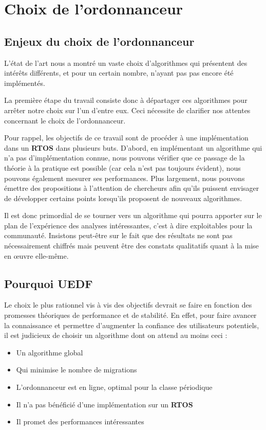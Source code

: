 \section{Choix de l'ordonnanceur}

	\subsection{Enjeux du choix de l'ordonnanceur}

	L'état de l'art nous a montré un vaste choix d'algorithmes qui présentent 
	des intérêts différents, et pour un certain nombre, 
	n'ayant pas pas encore été implémentés. \newline
	
	La première étape du travail consiste donc à départager ces algorithmes pour arrêter notre choix sur l'un d'entre eux. Ceci nécessite de clarifier nos attentes concernant le choix de l'ordonnanceur.\newline
	
	Pour rappel, les objectifs de ce travail sont de procéder à une implémentation dans 
	un \textbf{RTOS} dans plusieurs buts. 
	D'abord, en implémentant un algorithme qui n'a pas d'implémentation connue, nous 
	pouvons vérifier que ce passage de la théorie à la pratique est possible (car cela n'est pas 
	toujours évident), nous pouvons également mesurer ses performances. 
	Plus largement, nous pouvons émettre des propositions à l'attention de chercheurs 
	afin qu'ils puissent envisager de développer certains points lorsqu'ils proposent de nouveaux algorithmes. \newline
	
	Il est donc primordial de se tourner vers un algorithme qui pourra apporter sur le plan de 
	l'expérience des analyses intéressantes, c'est à dire exploitables pour la communauté. 
	Insistons peut-être sur le fait que des résultats ne sont pas nécessairement chiffrés mais 
	peuvent être des constats qualitatifs quant à la mise en œuvre elle-même.\newline
	
	\subsection{Pourquoi UEDF}
	
	Le choix le plus rationnel vis à vis des objectifs devrait se faire en fonction des 
	promesses théoriques de performance et de stabilité. 
	En effet, pour faire avancer la connaissance et permettre d'augmenter la confiance des utilisateurs 
	potentiels, il est judicieux de choisir un algorithme dont on attend au moins ceci :
	\begin{itemize}
		\item Un algorithme global
		\item Qui minimise le nombre de migrations
		\item L'ordonnanceur est en ligne, optimal pour la classe périodique
		\item Il n'a pas bénéficié d'une implémentation sur un \textbf{RTOS}
		\item Il promet des performances intéressantes
	\end{itemize}
	
